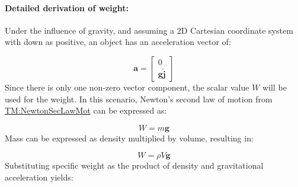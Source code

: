 \documentclass[12pt]{article}
\begin{document}
\paragraph{Detailed derivation of weight:}
\label{GD:weightDeriv}
Under the influence of gravity, and assuming a 2D Cartesian coordinate system with down as positive, an object has an acceleration vector of:

\begin{displaymath}
\symbf{a}=\begin{bmatrix}
          0\\
          \symbf{g} \symbf{\hat{j}}
          \end{bmatrix}
\end{displaymath}
Since there is only one non-zero vector component, the scalar value $W$ will be used for the weight. In this scenario, Newton's second law of motion from \hyperref[TM:NewtonSecLawMot]{TM:NewtonSecLawMot} can be expressed as:

\begin{displaymath}
W=m \symbf{g}
\end{displaymath}
Mass can be expressed as density multiplied by volume, resulting in:

\begin{displaymath}
W=ρ V \symbf{g}
\end{displaymath}
Substituting specific weight as the product of density and gravitational acceleration yields:
\end{document}
